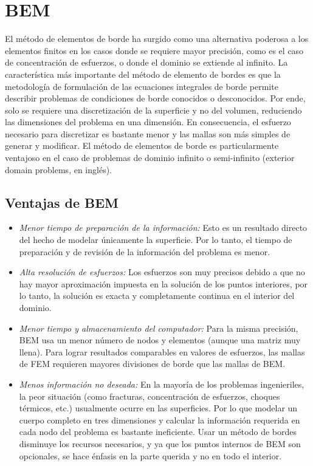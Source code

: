 \documentclass[12pt,letterpaper]{report}
\numberwithin{equation}{section}
\begin{document}
\section{BEM}

El método de elementos de borde ha surgido como una alternativa poderosa a los elementos finitos en los casos donde se requiere mayor precisión, como es el caso de concentración de esfuerzos, o donde el dominio se extiende al infinito. La característica más importante del método de elemento de bordes es que la metodología de formulación de las ecuaciones integrales de borde permite describir problemas de condiciones de borde conocidos o desconocidos. Por ende, solo se requiere una discretización de la superficie y no del volumen, reduciendo las dimensiones del problema en una dimensión. En consecuencia, el esfuerzo necesario para discretizar es bastante menor y las mallas son más simples de generar y modificar.
El método de elementos de borde es particularmente ventajoso en el caso de problemas de dominio infinito o semi-infinito (exterior domain problems, en inglés).

\subsection{Ventajas de BEM}
\begin{itemize}
	\item \textit{Menor tiempo de preparación de la información:} Esto es un resultado directo del hecho de modelar únicamente la superficie. Por lo tanto, el tiempo de preparación y de revisión de la información del problema es menor. \\
	\item \textit{Alta resolución de esfuerzos:} Los esfuerzos son muy precisos debido a que no hay mayor aproximación impuesta en la solución de los puntos interiores, por lo tanto, la solución es exacta y completamente continua en el interior del dominio.\\
	\item \textit{Menor tiempo y almacenamiento del computador:} Para la misma precisión, BEM usa un menor número de nodos y elementos (aunque una matriz muy llena). Para lograr resultados comparables en valores de esfuerzos, las mallas de FEM requieren mayores divisiones de borde que las mallas de BEM.\\
	\item \textit{Menos información no deseada:} En la mayoría de los problemas ingenieriles, la peor situación (como fracturas, concentración de esfuerzos, choques térmicos, etc.) usualmente ocurre en las superficies. Por lo que modelar un cuerpo completo en tres dimensiones y calcular la información requerida en cada nodo del problema es bastante ineficiente. Usar un método de bordes disminuye los recursos necesarios, y ya que los puntos internos de BEM son opcionales, se hace énfasis en la parte querida y no en todo el interior.
\end{itemize}
\end{document}
